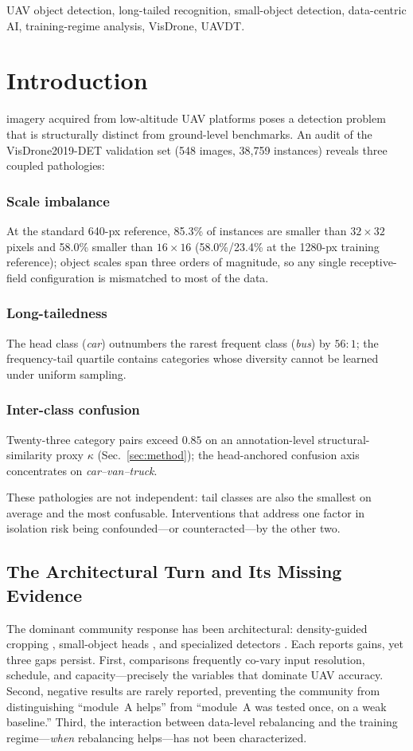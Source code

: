 \documentclass[journal]{IEEEtran}
\newcommand{\visdrone}{VisDrone2019-DET}
\begin{document}
\begin{IEEEkeywords}
UAV object detection, long-tailed recognition, small-object detection, data-centric AI, training-regime analysis, VisDrone, UAVDT.
\end{IEEEkeywords}

\section{Introduction}
 imagery acquired from low-altitude UAV platforms poses a detection problem that is structurally distinct from ground-level benchmarks. An audit of the \visdrone{} validation set (548 images, 38{,}759 instances) reveals three coupled pathologies:

\subsubsection{Scale imbalance} At the standard 640-px reference, 85.3\% of instances are smaller than $32{\times}32$ pixels and 58.0\% smaller than $16{\times}16$ (58.0\%/23.4\% at the 1280-px training reference); object scales span three orders of magnitude, so any single receptive-field configuration is mismatched to most of the data.

\subsubsection{Long-tailedness} The head class (\emph{car}) outnumbers the rarest frequent class (\emph{bus}) by $56{:}1$; the frequency-tail quartile contains categories whose diversity cannot be learned under uniform sampling.

\subsubsection{Inter-class confusion} Twenty-three category pairs exceed $0.85$ on an annotation-level structural-similarity proxy $\kappa$ (Sec.~\ref{sec:method}); the head-anchored confusion axis concentrates on \emph{car--van--truck}.

These pathologies are not independent: tail classes are also the smallest on average and the most confusable. Interventions that address one factor in isolation risk being confounded---or counteracted---by the other two.

\subsection{The Architectural Turn and Its Missing Evidence}
The dominant community response has been architectural: density-guided cropping \cite{clusdet,dmnet,ufpmp}, small-object heads \cite{tph,sahi}, and specialized detectors \cite{remdet,uavdetr}. Each reports gains, yet three gaps persist. First, comparisons frequently co-vary input resolution, schedule, and capacity---precisely the variables that dominate UAV accuracy. Second, negative results are rarely reported, preventing the community from distinguishing ``module~A helps'' from ``module~A was tested once, on a weak baseline.'' Third, the interaction between data-level rebalancing and the training regime---\emph{when} rebalancing helps---has not been characterized.
\end{document}
